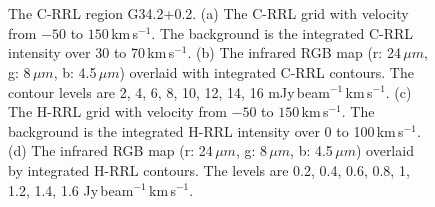 \documentclass[manuscript]{aastex61}
\newcommand{\kms}{\,km\,s$^{-1}$}
\newcommand{\um}{\mu m}
\begin{document}
\begin{figure}[htbp]
\centering
{}
\\
\\ 
\caption{The C-RRL region G34.2+0.2.
          (a) The C-RRL grid with velocity from $-50$ to $150$\kms.
	  The background is the integrated C-RRL intensity over 30 to 70\kms.
	  (b) The infrared RGB map (r: 24\,$\um$, g: 8\,$\um$, b: 4.5\,$\um$) overlaid with integrated C-RRL contours.
	  The contour levels are 2, 4, 6, 8, 10, 12, 14, 16 mJy\,beam$^{-1}$\kms.
	  (c) The H-RRL grid with velocity from $-50$ to $150$\kms.
	  The background is the integrated H-RRL intensity over 0 to 100\kms.
	  (d) The infrared RGB map (r: 24\,$\um$, g: 8\,$\um$, b: 4.5\,$\um$) overlaid by integrated H-RRL contours.
	  The levels are 0.2, 0.4, 0.6, 0.8, 1, 1.2, 1.4, 1.6 Jy\,beam$^{-1}$\kms.
	  }
\label{fig_crrl-g342}
\end{figure}
\end{document}
